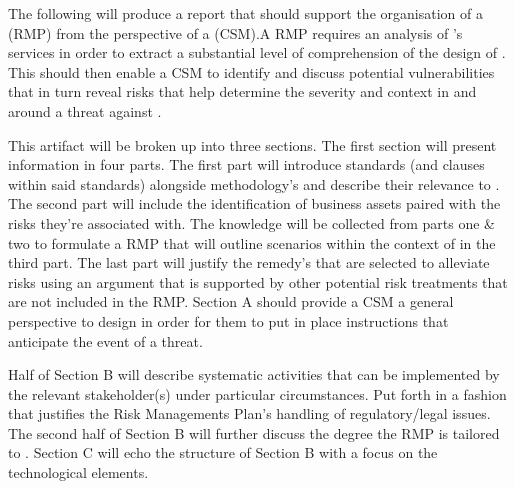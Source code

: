 

%

The following will produce a report that should support the organisation of a \rmp{} (RMP) 
from the perspective of a \csm{} (CSM).A RMP requires an analysis of \org's services in 
order to extract a substantial level of comprehension of the design of \org. 
This should then enable a CSM to identify and discuss potential vulnerabilities 
that in turn reveal risks that help determine the severity and context in and around 
a threat against \org \cite{ppsecurity}. 

This artifact will be broken up into three sections. The first section will present 
information in four parts. The first part will introduce standards (and clauses within 
said standards) alongside methodology's and describe their relevance to \org. 
The second part will include the identification of business assets paired with the risks 
they're associated with. The knowledge will be collected from parts one & two to
formulate a RMP that will outline scenarios within the context of \org in the third part. 
The last part will justify the remedy's that are selected to alleviate risks using 
an argument that is supported by other potential risk treatments that are not included 
in the RMP. Section A should
provide a CSM a general perspective to \org design 
in order for them to put in place instructions that anticipate the event of a threat.

Half of Section B will describe systematic activities that can be implemented by the relevant 
stakeholder(s) under particular circumstances. Put forth in a fashion that justifies the 
Risk Managements Plan's handling of regulatory/legal issues. The second half of Section B  
will further discuss the degree the RMP is tailored to \org. Section C 
will echo the structure of Section B with a focus on the technological elements.

